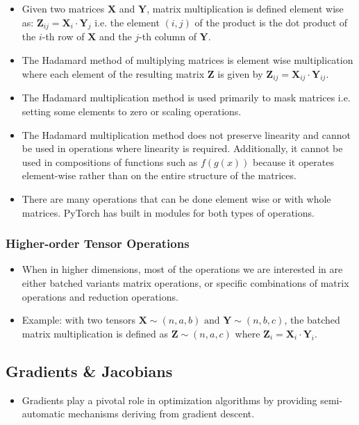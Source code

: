 \documentclass{article}
\newcommand{\mbf}[1]{\mathbf{#1}}
\begin{document}
\begin{itemize}
     \item Given two matrices $\mbf{X}$ and $\mbf{Y}$, matrix multiplication is defined element wise as: $\mbf{Z}_{ij} = \mbf{X}_i \cdot \mbf{Y}_j$ 
        i.e. the element $(i,j)$ of the product is the dot product of the $i$-th row of $\mbf{X}$ and the $j$-th column of $\mbf{Y}$.
        \item The Hadamard method of multiplying matrices is element wise multiplication where each element of the resulting matrix $\mbf{Z}$ is given by $\mbf{Z}_{ij} = \mbf{X}_{ij} \cdot \mbf{Y}_{ij}$.
        \item The Hadamard multiplication method is used primarily to mask matrices i.e. setting some elements to zero or scaling operations. 
        \item The Hadamard multiplication method does not preserve linearity and cannot be used in operations where linearity is required. Additionally, it cannot be used in compositions of functions such as $f(g(x))$ because it operates element-wise rather than on the entire structure of the matrices.
        \item There are many operations that can be done element wise or with whole matrices. PyTorch has built in modules for both types of operations. 
\end{itemize}

\subsubsection{Higher-order Tensor Operations}

\begin{itemize}
    \item When in higher dimensions, most of the operations we are interested in are either batched variants matrix operations, or specific combinations of matrix operations and reduction operations. 
    \item Example: with two tensors $\mbf{X} \sim (n,a,b) \text{ and } \mbf{Y} \sim (n,b,c)$, the batched matrix multiplication is defined as $\mbf{Z} \sim (n,a,c)$ where $\mbf{Z}_{i} = \mbf{X}_i \cdot \mbf{Y}_i$.
\end{itemize}

\subsection{Gradients \& Jacobians}

\begin{itemize}
    \item Gradients play a pivotal role in optimization algorithms by providing semi-automatic mechanisms deriving from gradient descent. 
\end{itemize}
\end{document}

